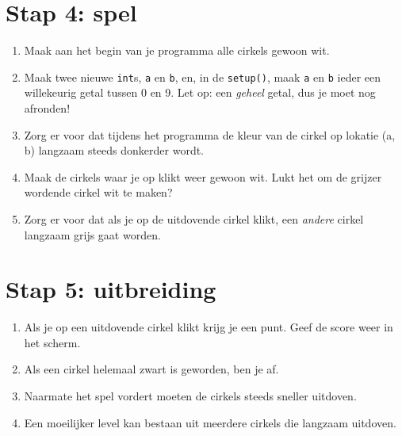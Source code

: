 \documentclass[a4paper,11pt]{article}
\begin{document}
\section{Stap 4: spel}

\begin{enumerate}
\item Maak aan het begin van je programma alle cirkels gewoon wit.
\item Maak twee nieuwe \verb|int|s, \verb|a| en \verb|b|, en, in de \verb|setup()|, maak \verb|a| en \verb|b| ieder een willekeurig getal tussen 0 en 9.  Let op: een \emph{geheel} getal, dus je moet nog afronden!
\item Zorg er voor dat tijdens het programma de kleur van de cirkel op lokatie (a, b) langzaam steeds donkerder wordt.
\item Maak de cirkels waar je op klikt weer gewoon wit.  Lukt het om de grijzer wordende cirkel wit te maken?
\item Zorg er voor dat als je op de uitdovende cirkel klikt, een \emph{andere} cirkel langzaam grijs gaat worden.
\end{enumerate}


\section{Stap 5: uitbreiding}

\begin{enumerate}
\item Als je op een uitdovende cirkel klikt krijg je een punt.  Geef de score weer in het scherm.
\item Als een cirkel helemaal zwart is geworden, ben je af.
\item Naarmate het spel vordert moeten de cirkels steeds sneller uitdoven.
\item Een moeilijker level kan bestaan uit meerdere cirkels die langzaam uitdoven.
\end{enumerate}
\end{document}
